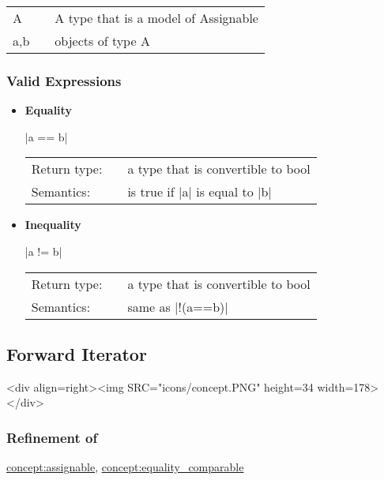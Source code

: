 \documentclass[12pt,twoside]{report}
\newcommand{\bool}{a type that is convertible to bool}
\begin{document}
\begin{tabular}[!h]{l l l}
A & & A type that is a model of Assignable\\
a,b & & objects of type A\\
\end{tabular}


\htmlrule[CLEAR=all]
 

\subsubsection*{Valid Expressions}
\begin{itemize}


\item {\bf Equality}
  
  |a == b|
  
  \begin{tabular}[!h]{l p{1cm} p{10cm}}
    Return type: & & \bool \\
    Semantics: & & is true if |a| is equal to |b|\\
  \end{tabular}
   

\item {\bf Inequality}
  
  |a != b|
  
  \begin{tabular}[!h]{l p{1cm} p{10cm}}
    Return type: & & \bool \\
    Semantics: & & same as |!(a==b)|\\
  \end{tabular}

\end{itemize}






\subsection{Forward Iterator}
\label{concept:forwarditerator}
\begin{htmlonly}
<div align=right><img SRC="icons/concept.PNG" height=34 width=178></div>
\end{htmlonly}



\htmlrule[CLEAR=all]  \subsubsection*{Refinement of}

\hyperref{Assignable}{Assignable (see Section}{)}{concept:assignable}, \hyperref{Equality Comparable}{Equality Comparable (see Section}{)}{concept:equality_comparable}
\end{document}
